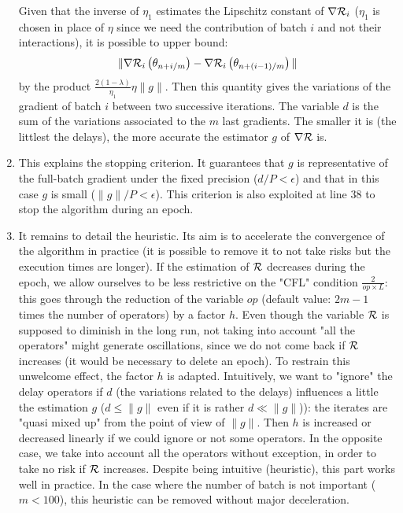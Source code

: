 \begin{enumerate}
	Given that the inverse of $\eta_1$ estimates the Lipschitz constant of $\nabla \mathcal{R}_i$ ($\eta_1$ is chosen in place of $\eta$ since we need the contribution of batch $i$ and not their interactions), it is possible to upper bound:
	\begin{equation*}
		\|\nabla \mathcal{R}_i\left(\theta_{n+i/m}\right)-\nabla \mathcal{R}_i\left(\theta_{n+(i-1)/m}\right)\|
	\end{equation*}
	by the product $\frac{2(1-\lambda)}{\eta_1}\eta\|g\|$. Then this quantity gives the variations of the gradient of batch $i$ between two successive iterations. The variable
        $d$ is the sum of the variations associated to the $m$ last gradients. The smaller it is (the littlest the delays), the more accurate the estimator $g$ of $\nabla \mathcal{R}$ is.
	\item This explains the stopping criterion. It guarantees that $g$ is representative of the full-batch gradient under the fixed precision ($d/P<\epsilon$) and that in this
          case $g$ is small ($\|g\|/P<\epsilon$). This criterion is also exploited at line 38 to stop the algorithm during an epoch.   
	\item It remains to detail the heuristic. Its aim is to accelerate the convergence of the algorithm in practice (it is possible to remove it to not take risks but the
          execution times are longer). If the estimation of $\mathcal{R}$ decreases during the epoch, we allow ourselves to be less restrictive on the "CFL" condition $\frac{2}{op\times L}$:
          this goes through the reduction of the variable $op$ (default value: $2m-1$ times the number of operators) by a factor $h$. Even though the variable $\mathcal{R}$ is supposed to diminish
          in the long run, not taking into account "all the operators" might generate oscillations, since we do not come back if $\mathcal{R}$ increases (it would be necessary to delete an epoch). To restrain this unwelcome effect, the factor $h$ is adapted. Intuitively, we want to "ignore" the delay operators if $d$ (the variations related to the delays) influences a little the estimation $g$ ($d\leq \|g\|$ even if it is rather $d\ll \|g\|$)): the iterates are "quasi mixed up" from the point of view of $\|g\|$. Then $h$ is increased or decreased linearly if we could ignore or not some operators. In the opposite case, we take into account all the operators without exception, in order to take no risk if $\mathcal{R}$ increases. Despite being intuitive (heuristic), this part works well in practice. In the case where the number of batch is not important ($m<100$), this heuristic can be removed without major deceleration. 
\end{enumerate}    


